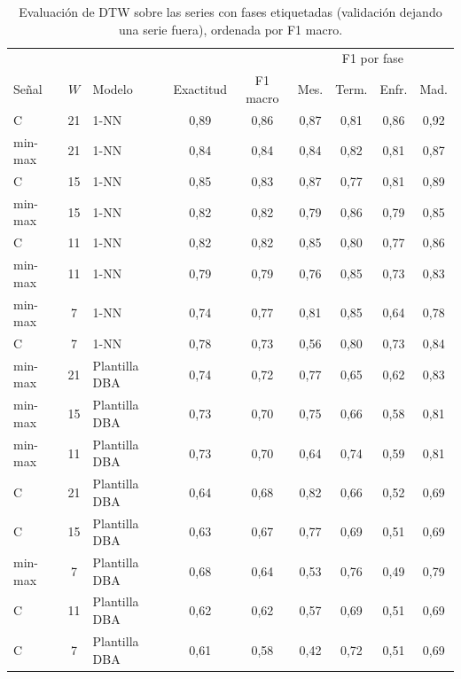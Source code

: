 \begin{table}[htbp]
\centering
\small
\caption{Evaluación de DTW sobre las series con fases etiquetadas (validación dejando una serie fuera), ordenada por F1 macro.}
\label{tab:eval_dtw}
\begin{tabular}{lclcccccc}
\hline
 & & & & & \multicolumn{4}{c}{F1 por fase} \\
Señal & $W$ & Modelo & Exactitud & F1 macro & Mes. & Term. & Enfr. & Mad. \\
\hline
\textdegree{}C & 21 & 1-NN & 0,89 & 0,86 & 0,87 & 0,81 & 0,86 & 0,92 \\
min-max & 21 & 1-NN & 0,84 & 0,84 & 0,84 & 0,82 & 0,81 & 0,87 \\
\textdegree{}C & 15 & 1-NN & 0,85 & 0,83 & 0,87 & 0,77 & 0,81 & 0,89 \\
min-max & 15 & 1-NN & 0,82 & 0,82 & 0,79 & 0,86 & 0,79 & 0,85 \\
\textdegree{}C & 11 & 1-NN & 0,82 & 0,82 & 0,85 & 0,80 & 0,77 & 0,86 \\
min-max & 11 & 1-NN & 0,79 & 0,79 & 0,76 & 0,85 & 0,73 & 0,83 \\
min-max & 7 & 1-NN & 0,74 & 0,77 & 0,81 & 0,85 & 0,64 & 0,78 \\
\textdegree{}C & 7 & 1-NN & 0,78 & 0,73 & 0,56 & 0,80 & 0,73 & 0,84 \\
min-max & 21 & Plantilla DBA & 0,74 & 0,72 & 0,77 & 0,65 & 0,62 & 0,83 \\
min-max & 15 & Plantilla DBA & 0,73 & 0,70 & 0,75 & 0,66 & 0,58 & 0,81 \\
min-max & 11 & Plantilla DBA & 0,73 & 0,70 & 0,64 & 0,74 & 0,59 & 0,81 \\
\textdegree{}C & 21 & Plantilla DBA & 0,64 & 0,68 & 0,82 & 0,66 & 0,52 & 0,69 \\
\textdegree{}C & 15 & Plantilla DBA & 0,63 & 0,67 & 0,77 & 0,69 & 0,51 & 0,69 \\
min-max & 7 & Plantilla DBA & 0,68 & 0,64 & 0,53 & 0,76 & 0,49 & 0,79 \\
\textdegree{}C & 11 & Plantilla DBA & 0,62 & 0,62 & 0,57 & 0,69 & 0,51 & 0,69 \\
\textdegree{}C & 7 & Plantilla DBA & 0,61 & 0,58 & 0,42 & 0,72 & 0,51 & 0,69 \\
\hline
\end{tabular}
\end{table}